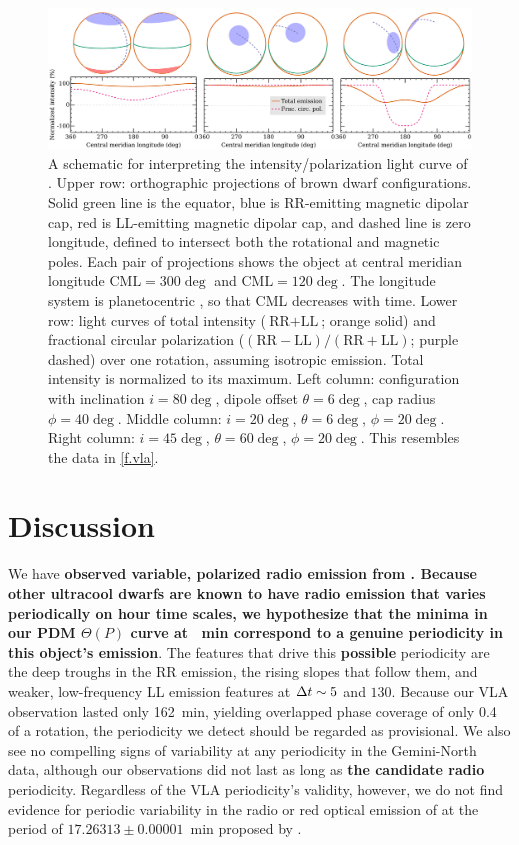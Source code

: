 \documentclass[twocolumn, times]{aastex6}
\begin{document}
\begin{figure}[tb]
  \includegraphics[width=\linewidth]{schematic}
  \caption{A schematic for interpreting the intensity/polarization light curve
    of . Upper row: orthographic projections of brown dwarf
    configurations. Solid green line is the equator, blue is RR-emitting
    magnetic dipolar cap, red is LL-emitting magnetic dipolar cap, and dashed
    line is zero longitude, defined to intersect both the rotational and
    magnetic poles. Each pair of projections shows the object at central
    meridian longitude $\text{CML} = 300\deg$ and $\text{CML} = 120\deg$. The
    longitude system is planetocentric \citep[see, e.g.,][]{z15}, so that CML
    decreases with time. Lower row: light curves of total intensity
    ($\text{RR} + \text{LL}$; orange solid) and fractional circular
    polarization ($(\text{RR} - \text{LL}) / (\text{RR} + \text{LL})$; purple
    dashed) over one rotation, assuming isotropic emission. Total intensity is
    normalized to its maximum. Left column: configuration with inclination $i
    = 80\deg$, dipole offset $\theta = 6\deg$, cap radius $\phi = 40\deg$.
    Middle column: $i = 20\deg$, $\theta = 6\deg$, $\phi = 20\deg$. Right
    column: $i = 45\deg$, $\theta = 60\deg$, $\phi = 20\deg$. This resembles
    the data in \autoref{f.vla}.}
  \label{f.schematic}
\end{figure}


\section{Discussion}
\label{s.disc}

We have \textbf{observed variable, polarized radio emission from
  . Because other ultracool dwarfs are known to have radio
  emission that varies periodically on \apx hour time scales, we hypothesize
  that the minima in our PDM $\Theta(P)$ curve at ~min correspond to a
  genuine periodicity in this object's emission}. The features that drive this
\textbf{possible} periodicity are the deep troughs in the RR emission, the
rising slopes that follow them, and weaker, low-frequency LL emission features
at ${\Delta t} \sim 5$ and $130$. Because our VLA observation lasted only 162~min,
yielding overlapped phase coverage of only 0.4 of a rotation, the periodicity
we detect should be regarded as provisional. We also see no compelling signs
of variability at any periodicity in the Gemini-North data, although our
observations did not last as long as \textbf{the candidate radio} periodicity.
Regardless of the VLA periodicity's validity, however, we do not find evidence
for periodic variability in the radio or red optical emission of 
at the period of $17.26313 \pm 0.00001$~min proposed by \citet{rw16}.
\end{document}
